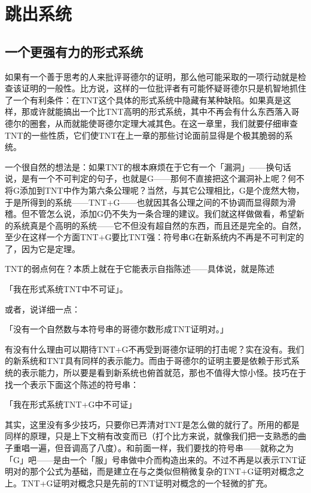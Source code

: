 \documentclass[
  12pt,
  twoside,
  openright,
  oldfontcommands,
]{memoir}
\begin{document}
\mainmatter
\setcounter{chapter}{13}
\markboth{}{}

\chapter{跳出系统}

\section{一个更强有力的形式系统}

如果有一个善于思考的人来批评哥德尔的证明，那么他可能采取的一项行动就是检查该证明的一般性。比方说，这样的一位批评者有可能怀疑哥德尔只是机智地抓住了一个有利条件：在TNT这个具体的形式系统中隐藏有某种缺陷。如果真是这样，那或许就能搞出一个比TNT高明的形式系统，其中不再会有什么东西落入哥德尔的圈套，从而就能使哥德尔定理大减其色。在这一章里，我们就要仔细审查TNT的一些性质，它们使TNT在上一章的那些讨论面前显得是个极其脆弱的系统。

一个很自然的想法是：如果TNT的根本麻烦在于它有一个「漏洞」------换句话说，是有一个不可判定的句子，也就是G------那何不直接把这个漏洞补上呢？何不将G添加到TNT中作为第六条公理呢？当然，与其它公理相比，G是个庞然大物，于是所得到的系统------TNT+G------也就因其各公理之间的不协调而显得颇为滑稽。但不管怎么说，添加G仍不失为一条合理的建议。我们就这样做做看，希望新的系统真是个高明的系统------它不但没有超自然的东西，而且还是完全的。自然，至少在这样一个方面TNT+G要比TNT强：符号串G在新系统内不再是不可判定的了，因为它是定理。

TNT的弱点何在？本质上就在于它能表示自指陈述------具体说，就是陈述

「我在形式系统TNT中不可证」。

或者，说详细一点：

「没有一个自然数与本符号串的哥德尔数形成TNT证明对。」

有没有什么理由可以期待TNT+G不再受到哥德尔证明的打击呢？实在没有。我们的新系统和TNT具有同样的表示能力。而由于哥德尔的证明主要是依赖于形式系统的表示能力，所以要是看到新系统也俯首就范，那也不值得大惊小怪。技巧在于找一个表示下面这个陈述的符号串：

「我在形式系统TNT+G中不可证」

其实，这里没有多少技巧，只要你已弄清对TNT是怎么做的就行了。所用的都是同样的原理，只是上下文稍有改变而已（打个比方来说，就像我们把一支熟悉的曲子重唱一遍，但音调高了八度）。和前面一样，我们要找的符号串------就称之为「G\textquotesingle」吧------是由一个「服」号串做中介而构造出来的。不过不再是以表示TNT证明对的那个公式为基础，而是建立在与之类似但稍微复杂的TNT+G证明对概念之上。TNT+G证明对概念只是先前的TNT证明对概念的一个轻微的扩充。
\end{document}
